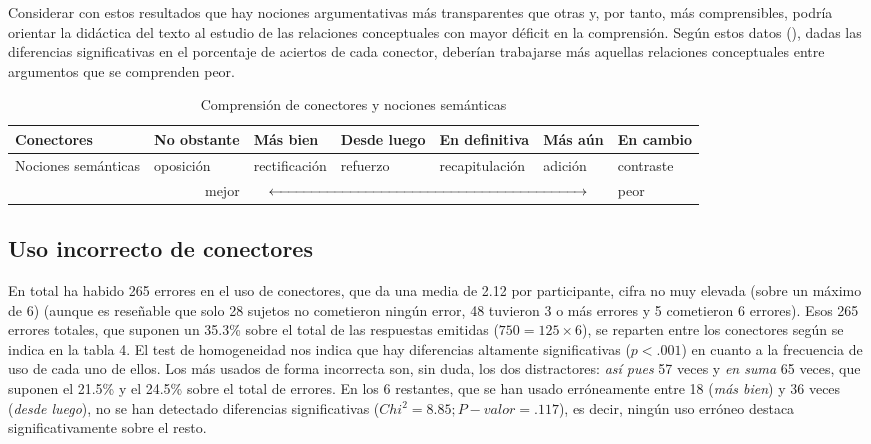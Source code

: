 \documentclass[spanish]{textolivre}
\begin{document}
Considerar con estos resultados que hay nociones argumentativas más transparentes que otras y, por tanto, más comprensibles, podría orientar la didáctica del texto al estudio de las relaciones conceptuales con mayor déficit en la comprensión. Según estos datos (), dadas las diferencias significativas en el porcentaje de aciertos de cada conector, deberían trabajarse más aquellas relaciones conceptuales entre argumentos que se comprenden peor.

\begin{table}[h!]
\centering
\begin{threeparttable}
\caption{Comprensión de conectores y nociones semánticas}
\label{tab3}
\begin{tabular}{lllllll}
\toprule
Conectores & No obstante & Más bien & Desde luego & En definitiva & Más aún & En cambio \\
\midrule
\multicolumn{1}{p{1.7cm}}{Nociones semánticas} & oposición & rectificación & refuerzo & recapitulación & adición & contraste \\
& \multicolumn{1}{r}{mejor} & \multicolumn{4}{c}{$\xleftrightarrow{\hspace*{7.75cm}}$} & peor \\
\bottomrule
\end{tabular}
\end{threeparttable}
\end{table}


\subsection{Uso incorrecto de conectores}

En total ha habido 265 errores en el uso de conectores, que da una media de 2.12 por participante, cifra no muy elevada (sobre un máximo de 6) (aunque es reseñable que solo 28 sujetos no cometieron ningún error, 48 tuvieron 3 o más errores y 5 cometieron 6 errores). Esos 265 errores totales, que suponen un 35.3\% sobre el total de las respuestas emitidas ($750=125 \times 6$), se reparten entre los conectores según se indica en la tabla 4. El test de homogeneidad nos indica que hay diferencias altamente significativas ($p<.001$) en cuanto a la frecuencia de uso de cada uno de ellos. Los más usados de forma incorrecta son, sin duda, los dos distractores: \emph{así pues} 57 veces y \emph{en suma} 65 veces, que suponen el 21.5\% y el 24.5\% sobre el total de errores. En los 6 restantes, que se han usado erróneamente entre 18 (\emph{más bien}) y 36 veces (\emph{desde luego}), no se han detectado diferencias significativas ($Chi^2=8.85; P-valor=.117$), es decir, ningún uso erróneo destaca significativamente sobre el resto.
\end{document}
